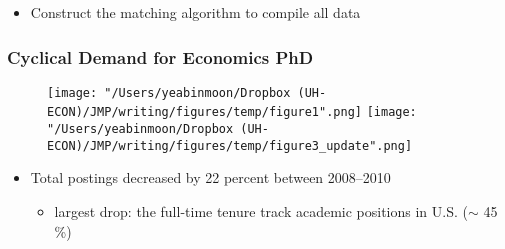 \documentclass[10pt,svgnames,fragile]{beamer}
\begin{document}
{\begin{frame}[label=Data]
\begin{itemize}
\vfill
			\item Construct the matching algorithm to compile all data %
\vfill
		\end{itemize}
	\end{frame}


%		


\begin{frame}
	\frametitle{Cyclical Demand for Economics PhD}
	
	\begin{figure}
		\centering
		\texttt{[image: "/Users/yeabinmoon/Dropbox (UH-ECON)/JMP/writing/figures/temp/figure1".png]} 
		\texttt{[image: "/Users/yeabinmoon/Dropbox (UH-ECON)/JMP/writing/figures/temp/figure3\_update".png]} 
	\end{figure}
	

	\begin{itemize}	
		\item Total postings decreased by 22 percent between 2008--2010
		\vspace{2 mm}
		\begin{itemize}
			\item largest drop: the full-time tenure track academic positions in U.S. ($\sim$ 45 \%)
		\end{itemize}
	\end{itemize}
\end{frame}
}
\end{document}
